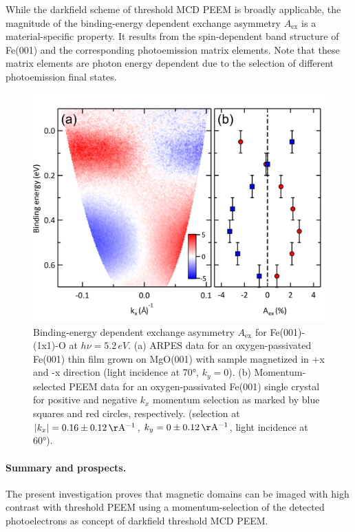 \documentclass[prl,twocolumn,floatfix]{revtex4-2}
\begin{document}
While the darkfield scheme of threshold MCD PEEM is broadly applicable, the magnitude of the binding-energy dependent exchange asymmetry $A_{\mathrm{ex}}$ is a material-specific property. It results from the spin-dependent band structure of Fe(001) and the corresponding photoemission matrix elements. Note that these matrix elements are photon energy dependent due to the selection of different photoemission final states.

\begin{figure}
    \centering
    \includegraphics[width = 0.9\columnwidth]{FePaperFigARPES.pdf}
    \caption{Binding-energy dependent exchange asymmetry $A_{\mathrm{ex}}$ for Fe(001)-(1x1)-O at $h\nu = 5.2\,eV$. (a) ARPES data for an oxygen-passivated Fe(001) thin film grown on MgO(001) with sample magnetized in +x and -x direction (light incidence at 70°, $k_y = 0$). (b) Momentum-selected PEEM data for an oxygen-passivated Fe(001) single crystal for positive and negative $k_x$ momentum selection as marked by blue squares and red circles, respectively. (selection at $|k_x| = \unit[0.16\pm0.12]{\AA^{-1}}$, $k_y = \unit[0\pm0.12]{\AA^{-1}}$, light incidence at 60°). 
    }
    \label{fig:AexContrast}
\end{figure}

\paragraph{Summary and prospects.} The present investigation proves that magnetic domains can be imaged with high contrast with threshold PEEM using a momentum-selection of the detected photoelectrons as concept of darkfield threshold MCD PEEM. 
\end{document}
